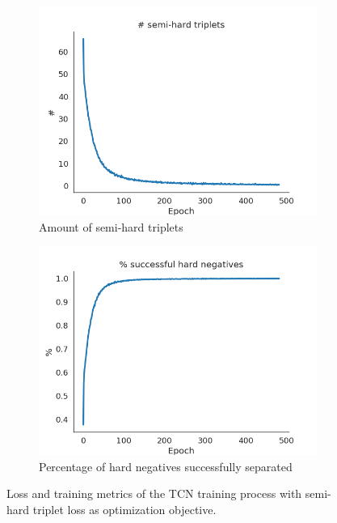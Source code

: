 \documentclass[\home/main.tex]{subfiles}
\begin{document}
\begin{figure}[p]{}
    \begin{subfigure}[t]{0.45\textwidth}
        \centering
        \includegraphics[width=\linewidth]{figures/figs_plots_semi-hard-triplets.png}
        \caption{Amount of semi-hard triplets}
        \label{fig:rewards_semihardtriplets}
    \end{subfigure}
    \hfill
    \begin{subfigure}[t]{0.45\textwidth}
        \centering
        \includegraphics[width=\linewidth]{figures/figs_plots_succesful-hard-negatives.png}
        \caption{Percentage of hard negatives successfully separated}
        \label{fig:rewards_successfulhardnegatives}
    \end{subfigure}

    \caption{Loss and training metrics of the TCN training process with semi-hard triplet loss as optimization objective.}
    \label{fig:rewards_tcn_training_metrics}
\end{figure}
\end{document}
